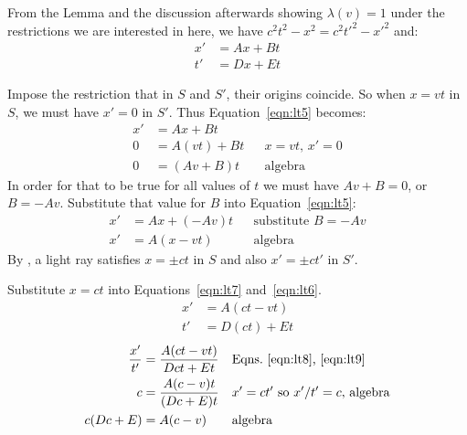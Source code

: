 \documentclass[a4paper]{article}
\theoremstyle{plain}
\theoremstyle{definition}
\begin{document}
From the Lemma and the discussion afterwards showing $\lambda(v)=1$
under the restrictions we are interested in here,
we have $c^2 t^2 - x^2 = c^2 t'^2 - x'^2$ and:
\begin{align}
x' & = Ax + Bt \label{eqn:lt5} \\
t' & = Dx + Et \label{eqn:lt6}
\end{align}

Impose the restriction that in $S$ and $S'$, their origins coincide.
So when $x = vt$ in $S$, we must have $x' = 0$ in $S'$.
Thus Equation~\eqref{eqn:lt5} becomes:
\begin{align*}
x' & = Ax + Bt \\
0  & = A(vt) + Bt & & \text{$x=vt$, $x'=0$} \\
0  & = (Av + B) t & & \text{algebra}
\end{align*}
In order for that to be true for all values of $t$
we must have $Av + B = 0$, or $B = -Av$.
Substitute that value for $B$ into Equation~\eqref{eqn:lt5}:
\begin{align}
x' & = Ax + (-Av)t & & \text{substitute $B = -Av$} \nonumber \\
x' & = A (x-vt) & & \text{algebra} \label{eqn:lt7}
\end{align}
By \esol, a light ray satisfies $x = \pm ct$ in $S$
and also $x' = \pm ct'$ in $S'$.

Substitute $x = ct$ into Equations~\eqref{eqn:lt7} and~\eqref{eqn:lt6}.
\begin{align}
x' & = A (ct - vt) \label{eqn:lt8} \\
t' & = D(ct) + Et \label{eqn:lt9}
\end{align}
\begin{align}
\frac{x'}{t'} & = \frac{A (ct - vt)}{Dct+Et} & & \text{Eqns.~\eqref{eqn:lt8},~\eqref{eqn:lt9}} \nonumber \\
c & = \frac{A(c-v)t}{(Dc+E)t} & & \text{$x'=ct'$ so $x'/t'=c$, algebra} \nonumber \\
c(Dc+E) & = A(c-v) & & \text{algebra} \label{eqn:lt10}
\end{align}
\end{document}
